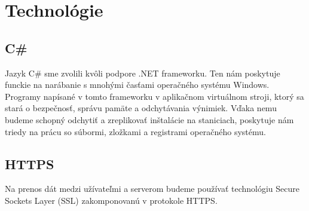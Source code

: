 \chapter{Technológie}

\section{C\#}
Jazyk C\# sme zvolili kvôli podpore .NET frameworku. Ten nám poskytuje funckie na narábanie s mnohými časťami operačného systému Windows. Programy napísané v tomto frameworku v aplikačnom virtuálnom stroji, ktorý sa stará o bezpečnosť, správu pamäte a odchytávania výnimiek. Vďaka nemu budeme schopný odchytiť a zreplikovať inštalácie na staniciach, poskytuje nám triedy na prácu so súbormi, zložkami a registrami operačného systému.

\section{HTTPS}
Na prenos dát medzi užívateľmi a serverom budeme používať technológiu Secure Sockets Layer (SSL) zakomponovanú v protokole HTTPS. 